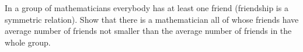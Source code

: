 In a group of mathematicians everybody has at least one friend (friendship is a symmetric relation). Show that there is a mathematician all of whose friends have average number of friends not smaller than the average number of friends in the whole group.